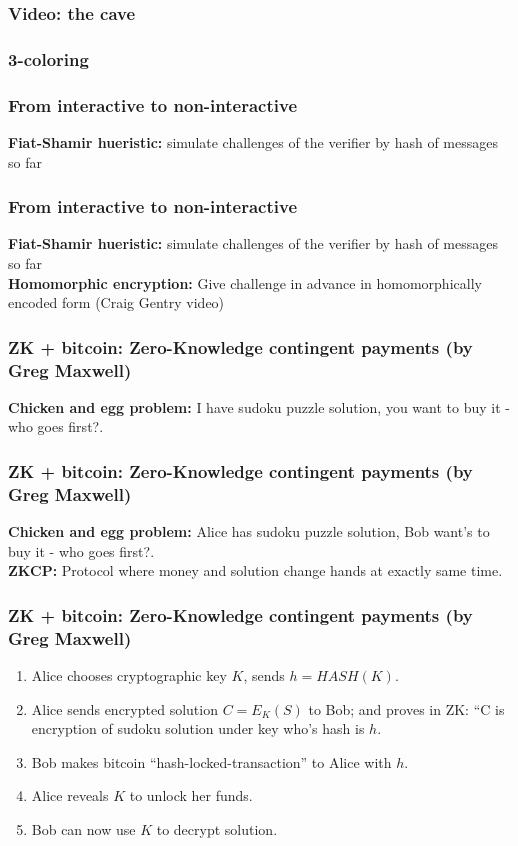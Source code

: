\documentclass[shadesubsections,trans,14pt,mathserif]{beamer}
\begin{document}
\begin{frame}
  \frametitle{Video: the cave}   %
\end{frame}


\begin{frame}
 \frametitle{3-coloring}
\end{frame}



\begin{frame}
  \frametitle{From interactive to non-interactive}
\textbf{Fiat-Shamir hueristic:} simulate challenges of the verifier by hash of messages so far
 \vspace{0.4in}
  
  
\end{frame}
\begin{frame}
  \frametitle{From interactive to non-interactive}
\textbf{Fiat-Shamir hueristic:} simulate challenges of the verifier by hash of messages so far\\
 \vspace{0.4in}
\textbf{Homomorphic encryption:} Give challenge in advance in homomorphically encoded form (Craig Gentry video)
 \vspace{0.4in}
\end{frame}

\begin{frame}
  \frametitle{ZK + bitcoin: Zero-Knowledge contingent payments \small{(by Greg Maxwell)}}
\textbf{Chicken and egg problem:} I have sudoku puzzle solution, you want to buy it - who goes first?.
 \vspace{0.4in}
\end{frame}

\begin{frame}
  \frametitle{ZK + bitcoin: Zero-Knowledge contingent payments \small{(by Greg Maxwell)}}
\textbf{Chicken and egg problem:} Alice has sudoku puzzle solution, Bob want's to buy it - who goes first?.\\
 \vspace{0.4in}
\textbf{ZKCP:} Protocol where money and solution change hands at exactly same time.
 \vspace{0.4in}
\end{frame}


\begin{frame}
  \frametitle{ZK + bitcoin: Zero-Knowledge contingent payments \small{(by Greg Maxwell)}}
\begin{enumerate}
 \item Alice chooses cryptographic key  $K$, sends $h =HASH(K)$.
 \item Alice sends encrypted solution $C=E_K(S)$ to Bob; and proves in ZK: ``C is encryption of sudoku solution under key who's hash is $h$.
  \item Bob makes bitcoin ``hash-locked-transaction'' to Alice with $h$.
 \item Alice reveals $K$ to unlock her funds.
 \item Bob can now use $K$ to decrypt solution.
\end{enumerate}

\end{frame}
\end{document}
